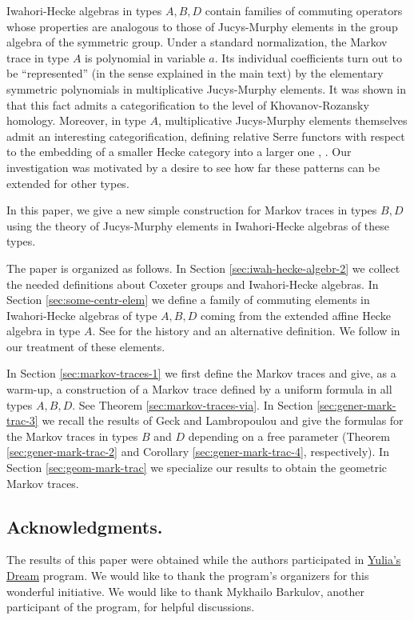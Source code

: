 \documentclass[11pt,leqno]{article}
\theoremstyle{definition}
\theoremstyle{definition}
\theoremstyle{remark}
\begin{document}
Iwahori-Hecke algebras in types $A, B, D$ contain families of commuting operators whose properties are analogous to those of Jucys-Murphy elements in the group algebra of the symmetric group. 
Under a standard normalization, the Markov trace in type $A$ is polynomial in variable $a$. Its individual coefficients turn out to be ``represented'' (in the sense explained in the main text) by the elementary symmetric polynomials in multiplicative Jucys-Murphy elements. It was shown in \cite{bezrukavnikovMonodromicModelKhovanov2022} that this fact admits a categorification to the level of Khovanov-Rozansky homology. Moreover, in type $A$, multiplicative Jucys-Murphy elements themselves admit an interesting categorification, defining relative Serre functors with respect to the embedding of a smaller Hecke category into a larger one \cite{gorskySerreDualityKhovanov2019}, \cite{ho2025relative}.  Our investigation was motivated by a desire to see how far these patterns can be extended for other types.

In this paper, we give a new simple construction for Markov traces in types $B, D$ using the theory of Jucys-Murphy elements in Iwahori-Hecke algebras of these types.

The paper is organized as follows.
In Section \ref{sec:iwah-hecke-algebr-2} we collect the needed definitions about Coxeter groups and Iwahori-Hecke algebras. In Section \ref{sec:some-centr-elem} we define a family of commuting elements in Iwahori-Hecke algebras of type $A, B, D$ coming from the extended affine Hecke algebra in type $A$. See \cite{ram1997seminormal} for the history and an alternative definition. We follow \cite{Ram2003} in our treatment of these elements.

In Section \ref{sec:markov-traces-1} we first define the Markov traces and give, as a warm-up, a construction of a Markov trace defined by a uniform formula in all types $A, B, D$. See Theorem \ref{sec:markov-traces-via}. In Section \ref{sec:gener-mark-trac-3} we recall the results of Geck and Lambropoulou and give the formulas for the Markov traces in types $B$ and $D$ depending on a free parameter (Theorem \ref{sec:gener-mark-trac-2} and Corollary \ref{sec:gener-mark-trac-4}, respectively). In Section \ref{sec:geom-mark-trac} we specialize our results to obtain the geometric Markov traces.

\subsection{Acknowledgments.} The results of this paper were obtained while the authors participated in \href{https://math.mit.edu/research/highschool/primes/YuliasDream/}{Yulia's Dream} program. We would like to thank the program's or\-ga\-ni\-zers for this wonderful initiative. We would like to thank Mykhailo Barkulov, another participant of the program, for helpful discussions.
\end{document}
